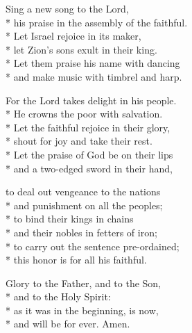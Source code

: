  Sing a new song to the Lord, \\*
 his praise in the assembly of the faithful. \\*
Let Israel rejoice in its maker, \\*
let Zion's sons exult in their king. \\*
Let them praise his name with dancing \\*
and make music with timbrel and harp.

 For the Lord takes delight in his people. \\*
He crowns the poor with salvation. \\*
Let the faithful rejoice in their glory, \\*
shout for joy and take their rest. \\*
Let the praise of God be on their lips \\*
and a two-edged sword in their hand,

 to deal out vengeance to the nations \\*
and punishment on all the peoples; \\*
to bind their kings in chains \\*
and their nobles in fetters of iron; \\*
to carry out the sentence pre-ordained; \\*
this honor is for all his faithful.

 Glory to the Father, and to the Son, \\*
and to the Holy Spirit: \\*
 as it was in the beginning, is now, \\*
and will be for ever. Amen.